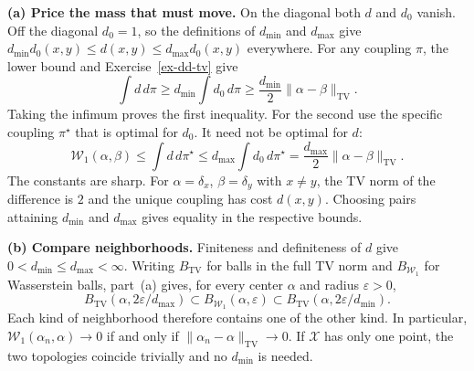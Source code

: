 \documentclass[11pt,a4paper]{article}
\theoremstyle{exostyle}
\newcommand{\Wone}{\mathcal{W}_1}
\newcommand{\X}{\mathcal X}
\begin{document}
\begin{solution}
\textbf{(a) Price the mass that must move.}
On the diagonal both $d$ and $d_0$ vanish. Off the diagonal $d_0=1$,
so the definitions of $d_{\min}$ and $d_{\max}$ give
$d_{\min}d_0(x,y)\le d(x,y)\le d_{\max}d_0(x,y)$ everywhere.
For any coupling $\pi$, the lower bound and Exercise~\ref{ex-dd-tv} give
\[
  \int d\,d\pi\ge d_{\min}\int d_0\,d\pi
                \ge \frac{d_{\min}}2\|\alpha-\beta\|_{\mathrm{TV}}.
\]
Taking the infimum proves the first inequality. For the second use the
specific coupling $\pi^\star$ that is optimal for $d_0$. It need not be
optimal for $d$:
\[
  \Wone(\alpha,\beta)\le\int d\,d\pi^\star
    \le d_{\max}\int d_0\,d\pi^\star
    =\frac{d_{\max}}2\|\alpha-\beta\|_{\mathrm{TV}} .
\]
The constants are sharp. For $\alpha=\delta_x$, $\beta=\delta_y$ with
$x\ne y$, the TV norm of the difference is $2$ and the unique coupling
has cost $d(x,y)$. Choosing pairs attaining $d_{\min}$ and $d_{\max}$
gives equality in the respective bounds.

\textbf{(b) Compare neighborhoods.}
Finiteness and definiteness of $d$ give $0<d_{\min}\le d_{\max}<\infty$.
Writing $B_{\mathrm{TV}}$ for balls in the full TV norm and $B_{\Wone}$
for Wasserstein balls, part~(a) gives, for every center $\alpha$
and radius $\varepsilon>0$,
\[
  B_{\mathrm{TV}}(\alpha,2\varepsilon/d_{\max})
   \subset B_{\Wone}(\alpha,\varepsilon)
   \subset B_{\mathrm{TV}}(\alpha,2\varepsilon/d_{\min}).
\]
Each kind of neighborhood therefore contains one of the other kind.
In particular, $\Wone(\alpha_n,\alpha)\to0$ if and only if
$\|\alpha_n-\alpha\|_{\mathrm{TV}}\to0$. If $\X$ has only one point,
the two topologies coincide trivially and no $d_{\min}$ is needed.
\end{solution}
\end{document}
